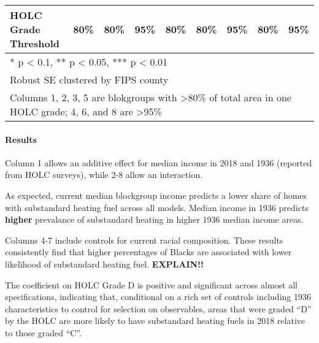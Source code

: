 \documentclass[
]{article}
\begin{document}
\begin{table}
{\begin{tabular}[t]{lcccccccc}
HOLC Grade Threshold & 80\% & 80\% & 95\% & 80\% & 80\% & 95\% & 80\% & 95\%\\
\bottomrule
\multicolumn{9}{l}{\textsuperscript{} * p < 0.1, ** p < 0.05, *** p < 0.01}\\
\multicolumn{9}{l}{\textsuperscript{} Robust SE clustered by FIPS county}\\
\multicolumn{9}{l}{\textsuperscript{} Columns 1, 2, 3, 5 are blokgroups with >80\% of total area in one HOLC grade; 4, 6, and 8 are >95\%}\\
\end{tabular}}
\end{table}

\hypertarget{results}{%
\paragraph{Results}\label{results}}

Column 1 allows an additive effect for median income in 2018 and 1936
(reported from HOLC surveys), while 2-8 allow an interaction.

As expected, current median blockgroup income predicts a lower share of
homes with substandard heating fuel across all models. Median income in
1936 predicts \textbf{higher} prevalance of substandard heating in
higher 1936 median income areas.

Columns 4-7 include controls for current racial composition. These
results consistently find that higher percentages of Blacks are
associated with lower likelihood of substandard heating fuel.
\textbf{EXPLAIN!!}

The coefficient on HOLC Grade D is positive and significant across
almost all specifications, indicating that, conditional on a rich set of
controls including 1936 characteristics to control for selection on
observables, areas that were graded ``D'' by the HOLC are more likely to
have substandard heating fuels in 2018 relative to those graded ``C''.
\end{document}

